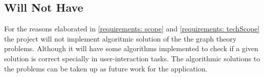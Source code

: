 \subsection{Will Not Have}
\label{requirements: willnothave}
For the reasons elaborated in \autoref{requirements: scope} and
\autoref{requirements: techScope} the project will not implement algoritmic
solution of the the graph theory problems.  Although it will have some
algorithms implemented to check if a given solution is correct specially in
user-interaction tasks.  The algorithmic solutions to the problems can be taken
up as future work for the application.
